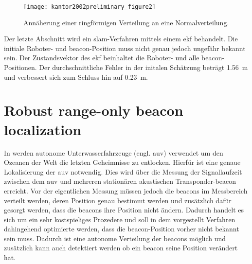 \begin{figure}[htbp]
	\centering
	\texttt{[image: kantor2002preliminary\_figure2]}
	\caption{Annäherung einer ringförmigen Verteilung an eine Normalverteilung.}
	\label{fig:kantor2002preliminary_figure2}
\end{figure}

Der letzte Abschnitt wird ein \Gls{slam}-Verfahren mittels einem \Gls{ekf} behandelt. Die initiale Roboter- und \Gls{beacon}-Position muss nicht genau jedoch ungefähr bekannt sein. Der Zustandsvektor des \Gls{ekf} beinhaltet die Roboter- und alle \Gls{beacon}-Positionen. Der durchschnittliche Fehler in der initalen Schätzung beträgt \SI{1.56}{\metre} und verbessert sich zum Schluss hin auf \SI{0.23}{\metre}.


%
%


%
%
\section{Robust range-only beacon localization}

In \cite{olson2004robust} werden autonome Unterwasserfahrzeuge (engl. \gls{auv}) verwendet um den Ozeanen der Welt die letzten Geheimnisse zu entlocken. Hierfür ist eine genaue Lokalisierung der \gls{auv} notwendig. Dies wird über die Messung der Signallaufzeit zwischen dem \gls{auv} und mehreren stationären akustischen Transponder-\Gls{beacon} erreicht. Vor der eigentlichen Messung müssen jedoch die \Glspl{beacon} im Messbereich verteilt werden, deren Position genau bestimmt werden und zusätzlich dafür gesorgt werden, dass die \Glspl{beacon} ihre Position nicht ändern. Dadurch handelt es sich um ein sehr kostspieliges Prozedere und soll in dem vorgestellt Verfahren dahingehend optimierte werden, dass die \Gls{beacon}-Position vorher nicht bekannt sein muss. Dadurch ist eine autonome Verteilung der \Glspl{beacon} möglich und zusätzlich kann auch detektiert werden ob ein \Gls{beacon} seine Position verändert hat.

